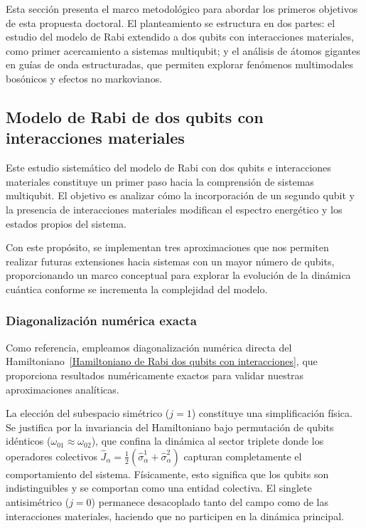 \documentclass[onecolumn,notitlepage,letterpaper,aps,pra,12pt]{article}
\numberwithin{equation}{section}
\begin{document}
Esta sección presenta el marco metodológico para abordar los primeros objetivos de esta propuesta doctoral. El planteamiento se estructura en dos partes:  el estudio del modelo de Rabi extendido a dos qubits con interacciones materiales, como primer acercamiento a sistemas multiqubit; y el análisis de átomos gigantes en guías de onda estructuradas, que permiten explorar fenómenos multimodales bosónicos y efectos no markovianos. 

\subsection{Modelo de Rabi de dos qubits con interacciones materiales}

Este estudio sistemático del modelo de Rabi con dos qubits e interacciones materiales constituye un primer paso hacia la comprensión de sistemas multiqubit. El objetivo es analizar cómo la incorporación de un segundo qubit y la presencia de interacciones materiales modifican el espectro energético y los estados propios del sistema.

Con este propósito, se implementan tres aproximaciones  que nos permiten realizar futuras extensiones hacia sistemas con un mayor número de qubits, proporcionando un marco conceptual para explorar la evolución de la dinámica cuántica conforme se incrementa la complejidad del modelo.


\subsubsection{Diagonalización numérica exacta}

Como referencia, empleamos diagonalización numérica directa del Hamiltoniano~\eqref{Hamiltoniano de Rabi dos qubits con interacciones}, que proporciona resultados numéricamente exactos para validar nuestras aproximaciones analíticas. 

La elección del subespacio simétrico ($j=1$) constituye una simplificación física. Se justifica por la invariancia del Hamiltoniano bajo permutación de qubits idénticos ($\omega_{01} \approx \omega_{02}$), que confina la dinámica al sector triplete donde los operadores colectivos $\hat{J}_{\alpha} = \frac{1}{2}(\hat{\sigma}_{\alpha}^{1} + \hat{\sigma}_{\alpha}^{2})$ capturan completamente el comportamiento del sistema. Físicamente, esto significa que los qubits son indistinguibles y se comportan como una entidad colectiva. El singlete antisimétrico ($j=0$) permanece desacoplado tanto del campo como de las interacciones materiales, haciendo que no participen en la dinámica principal.
\end{document}

